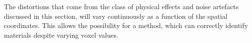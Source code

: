 The distortions that come from the class of physical effects and noise artefacts discussed in this
section, will vary continuously as a function of the spatial coordinates. This allows the possibility
for a method, which can correctly identify materials despite varying voxel values.



